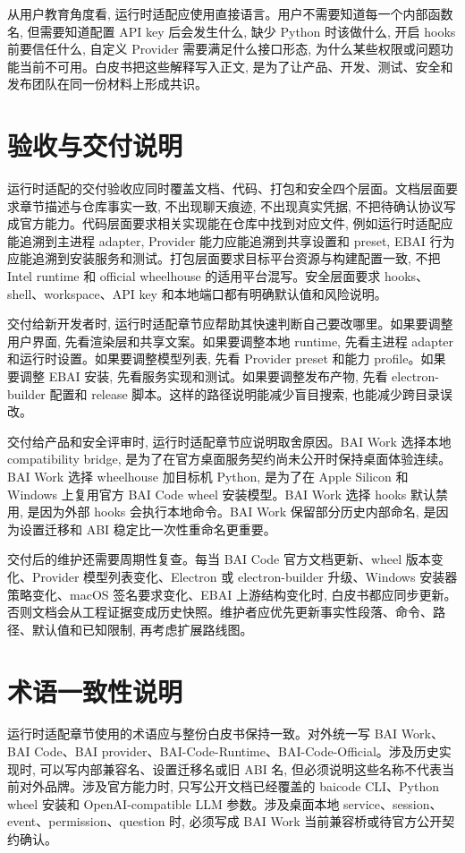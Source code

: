 从用户教育角度看, 运行时适配应使用直接语言。用户不需要知道每一个内部函数名, 但需要知道配置 API key 后会发生什么, 缺少 Python 时该做什么, 开启 hooks 前要信任什么, 自定义 Provider 需要满足什么接口形态, 为什么某些权限或问题功能当前不可用。白皮书把这些解释写入正文, 是为了让产品、开发、测试、安全和发布团队在同一份材料上形成共识。

\section{验收与交付说明}
运行时适配的交付验收应同时覆盖文档、代码、打包和安全四个层面。文档层面要求章节描述与仓库事实一致, 不出现聊天痕迹, 不出现真实凭据, 不把待确认协议写成官方能力。代码层面要求相关实现能在仓库中找到对应文件, 例如运行时适配应能追溯到主进程 adapter, Provider 能力应能追溯到共享设置和 preset, EBAI 行为应能追溯到安装服务和测试。打包层面要求目标平台资源与构建配置一致, 不把 Intel runtime 和 official wheelhouse 的适用平台混写。安全层面要求 hooks、shell、workspace、API key 和本地端口都有明确默认值和风险说明。

交付给新开发者时, 运行时适配章节应帮助其快速判断自己要改哪里。如果要调整用户界面, 先看渲染层和共享文案。如果要调整本地 runtime, 先看主进程 adapter 和运行时设置。如果要调整模型列表, 先看 Provider preset 和能力 profile。如果要调整 EBAI 安装, 先看服务实现和测试。如果要调整发布产物, 先看 electron-builder 配置和 release 脚本。这样的路径说明能减少盲目搜索, 也能减少跨目录误改。

交付给产品和安全评审时, 运行时适配章节应说明取舍原因。BAI Work 选择本地 compatibility bridge, 是为了在官方桌面服务契约尚未公开时保持桌面体验连续。BAI Work 选择 wheelhouse 加目标机 Python, 是为了在 Apple Silicon 和 Windows 上复用官方 BAI Code wheel 安装模型。BAI Work 选择 hooks 默认禁用, 是因为外部 hooks 会执行本地命令。BAI Work 保留部分历史内部命名, 是因为设置迁移和 ABI 稳定比一次性重命名更重要。

交付后的维护还需要周期性复查。每当 BAI Code 官方文档更新、wheel 版本变化、Provider 模型列表变化、Electron 或 electron-builder 升级、Windows 安装器策略变化、macOS 签名要求变化、EBAI 上游结构变化时, 白皮书都应同步更新。否则文档会从工程证据变成历史快照。维护者应优先更新事实性段落、命令、路径、默认值和已知限制, 再考虑扩展路线图。

\section{术语一致性说明}
运行时适配章节使用的术语应与整份白皮书保持一致。对外统一写 BAI Work、BAI Code、BAI provider、BAI-Code-Runtime、BAI-Code-Official。涉及历史实现时, 可以写内部兼容名、设置迁移名或旧 ABI 名, 但必须说明这些名称不代表当前对外品牌。涉及官方能力时, 只写公开文档已经覆盖的 baicode CLI、Python wheel 安装和 OpenAI-compatible LLM 参数。涉及桌面本地 service、session、event、permission、question 时, 必须写成 BAI Work 当前兼容桥或待官方公开契约确认。

